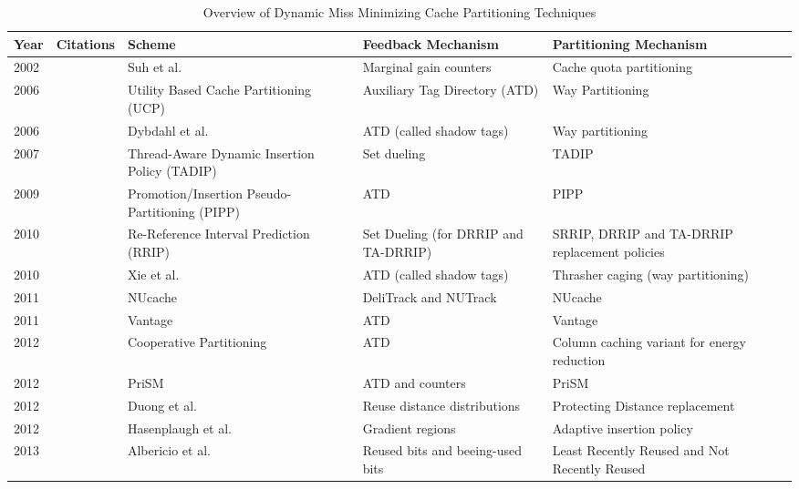
\begin{table*}[tp]
    \caption{Overview of Dynamic Miss Minimizing Cache Partitioning Techniques}
    \label{tab:cachePartTaxonomy}
    \begin{tabularx}{\textwidth}{lcXXXX}
    \toprule
    Year & Citations & Scheme & Feedback Mechanism & Partitioning Mechanism \\    
    \midrule
    2002 & & Suh et al.\ \cite{suh02,dynPartofSharedCacheMemory} & Marginal gain counters & Cache quota partitioning \\    
    2006 & & Utility Based Cache Partitioning (UCP) \cite{utilityBasedCachePartitioning} & Auxiliary Tag Directory (ATD) & Way Partitioning \\ 
    2006 & & Dybdahl et al.\ \cite{haakonHiPC} & ATD (called shadow tags) & Way partitioning \\
    2007 & & Thread-Aware Dynamic Insertion Policy (TADIP) \cite{jaleel08} & Set dueling \cite{shadowTagInsertionPolicies} & TADIP \\
    2009 & & Promotion/Insertion Pseudo-Partitioning (PIPP) \cite{xie09} & ATD & PIPP \\
    2010 & & Re-Reference Interval Prediction (RRIP) \cite{jaleel10} & Set Dueling (for DRRIP and TA-DRRIP) & SRRIP, DRRIP and TA-DRRIP replacement policies \\
    2010 & & Xie et al.\ \cite{xie10} & ATD (called shadow tags) & Thrasher caging (way partitioning) \\
    2011 & & NUcache \cite{manikantan11} & DeliTrack and NUTrack & NUcache \\
    2011 & & Vantage \cite{sanchez11} & ATD & Vantage \\
    2012 & & Cooperative Partitioning \cite{sundararajan12} & ATD & Column caching variant for energy reduction \\ %
    2012 & & PriSM \cite{manikantan12} & ATD and counters & PriSM \\ %
    2012 & & Duong et al.\ \cite{duong12} & Reuse distance distributions & Protecting Distance replacement \\
    2012 & & Hasenplaugh et al.\ \cite{hasenplaugh12}  & Gradient regions & Adaptive insertion policy \\ %
    2013 & &  Albericio et al.\ \cite{albericio13}  & Reused bits and beeing-used bits & Least Recently Reused and Not Recently Reused \\ %
    \bottomrule
    \end{tabularx}    
\end{table*}


